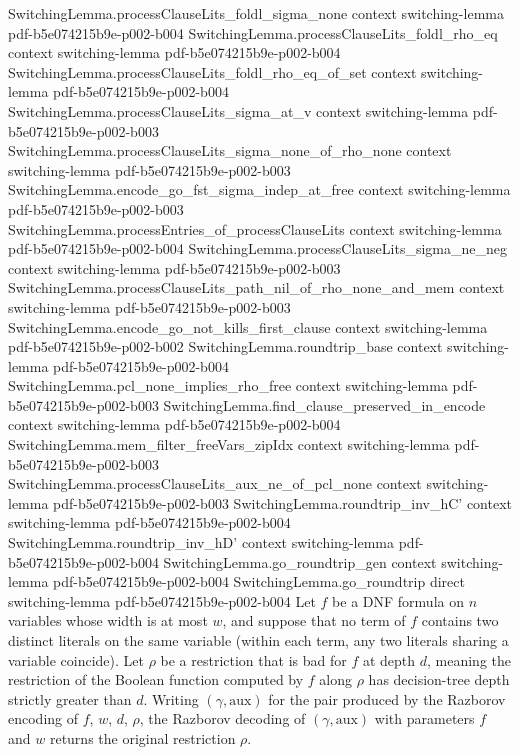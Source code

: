 \begin{lemma}
\proofstep
  {SwitchingLemma.processClauseLits_foldl_sigma_none}
  {context}
  {switching-lemma}
  {pdf-b5e074215b9e-p002-b004}
\proofstep
  {SwitchingLemma.processClauseLits_foldl_rho_eq}
  {context}
  {switching-lemma}
  {pdf-b5e074215b9e-p002-b004}
\proofstep
  {SwitchingLemma.processClauseLits_foldl_rho_eq_of_set}
  {context}
  {switching-lemma}
  {pdf-b5e074215b9e-p002-b004}
\proofstep
  {SwitchingLemma.processClauseLits_sigma_at_v}
  {context}
  {switching-lemma}
  {pdf-b5e074215b9e-p002-b003}
\proofstep
  {SwitchingLemma.processClauseLits_sigma_none_of_rho_none}
  {context}
  {switching-lemma}
  {pdf-b5e074215b9e-p002-b003}
\proofstep
  {SwitchingLemma.encode_go_fst_sigma_indep_at_free}
  {context}
  {switching-lemma}
  {pdf-b5e074215b9e-p002-b003}
\proofstep
  {SwitchingLemma.processEntries_of_processClauseLits}
  {context}
  {switching-lemma}
  {pdf-b5e074215b9e-p002-b004}
\proofstep
  {SwitchingLemma.processClauseLits_sigma_ne_neg}
  {context}
  {switching-lemma}
  {pdf-b5e074215b9e-p002-b003}
\proofstep
  {SwitchingLemma.processClauseLits_path_nil_of_rho_none_and_mem}
  {context}
  {switching-lemma}
  {pdf-b5e074215b9e-p002-b003}
\proofstep
  {SwitchingLemma.encode_go_not_kills_first_clause}
  {context}
  {switching-lemma}
  {pdf-b5e074215b9e-p002-b002}
\proofstep
  {SwitchingLemma.roundtrip_base}
  {context}
  {switching-lemma}
  {pdf-b5e074215b9e-p002-b004}
\proofstep
  {SwitchingLemma.pcl_none_implies_rho_free}
  {context}
  {switching-lemma}
  {pdf-b5e074215b9e-p002-b003}
\proofstep
  {SwitchingLemma.find_clause_preserved_in_encode}
  {context}
  {switching-lemma}
  {pdf-b5e074215b9e-p002-b004}
\proofstep
  {SwitchingLemma.mem_filter_freeVars_zipIdx}
  {context}
  {switching-lemma}
  {pdf-b5e074215b9e-p002-b003}
\proofstep
  {SwitchingLemma.processClauseLits_aux_ne_of_pcl_none}
  {context}
  {switching-lemma}
  {pdf-b5e074215b9e-p002-b003}
\proofstep
  {SwitchingLemma.roundtrip_inv_hC'}
  {context}
  {switching-lemma}
  {pdf-b5e074215b9e-p002-b004}
\proofstep
  {SwitchingLemma.roundtrip_inv_hD'}
  {context}
  {switching-lemma}
  {pdf-b5e074215b9e-p002-b004}
\proofstep
  {SwitchingLemma.go_roundtrip_gen}
  {context}
  {switching-lemma}
  {pdf-b5e074215b9e-p002-b004}
\proofstep
  {SwitchingLemma.go_roundtrip}
  {direct}
  {switching-lemma}
  {pdf-b5e074215b9e-p002-b004}
Let $f$ be a DNF formula on $n$ variables whose width is at most $w$, and suppose that
no term of $f$ contains two distinct literals on the same variable (within each term,
any two literals sharing a variable coincide). Let $\rho$ be a restriction that is bad
for $f$ at depth $d$, meaning the restriction of the Boolean function computed by $f$
along $\rho$ has decision-tree depth strictly greater than $d$. Writing $(\gamma,
\mathrm{aux})$ for the pair produced by the Razborov encoding of $f$, $w$, $d$, $\rho$,
the Razborov decoding of $(\gamma, \mathrm{aux})$ with parameters $f$ and $w$ returns
the original restriction $\rho$.
\end{lemma}

